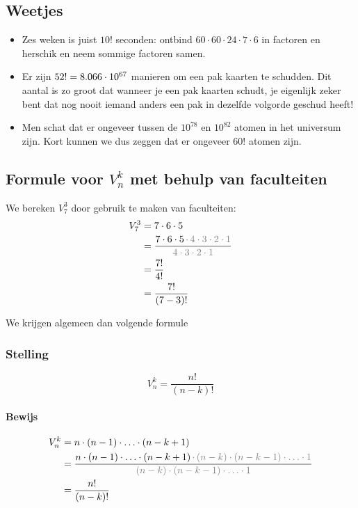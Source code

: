 \documentclass[12pt,a4paper,twoside]{article}
\begin{document}
\subsection*{Weetjes}
\begin{itemize}
  \item Zes weken is juist $10!$ seconden: ontbind $60\cdot 60\cdot 24\cdot 7\cdot 6$ in factoren en herschik en neem sommige factoren samen.
  \item Er zijn $52!=8.066\cdot 10^{67}$ manieren om een pak kaarten te schudden. Dit aantal is zo groot dat wanneer je een pak kaarten schudt, je eigenlijk zeker bent dat nog nooit iemand anders een pak in dezelfde volgorde geschud heeft!
  \item Men schat dat er ongeveer tussen de $10^{78}$ en $10^{82}$ atomen in het universum zijn. Kort kunnen we dus zeggen dat er ongeveer $60!$ atomen zijn.
\end{itemize}

\subsection{Formule voor $V^k_n$ met behulp van faculteiten}

We bereken $V^3_7$ door gebruik te maken van faculteiten:
\begin{align*}
  V^3_7 &= 7 \cdot 6 \cdot 5\\
        &= \dfrac{7 \cdot 6 \cdot 5 \, \color{gray}{ \cdot \, 4 \cdot 3 \cdot 2 \cdot 1}}{\color{gray}{4 \cdot 3 \cdot 2 \cdot 1}}\\
        &= \dfrac{7!}{4!}\\
        &= \dfrac{7!}{(7-3)!}\\
\end{align*}

We krijgen algemeen dan volgende formule

\subsubsection*{Stelling}
\begin{mdframed}
$$V^k_n=\dfrac{n!}{(n-k)!}$$
\end{mdframed}

\paragraph*{Bewijs}
\begin{align*}
  V^k_n &= n \cdot (n-1) \cdot \ldots \cdot (n-k+1)\\
        &= \dfrac{n \cdot (n-1) \cdot \ldots \cdot (n-k+1) \, \color{gray}{ \cdot \, (n-k) \cdot (n-k-1) \cdot \ldots \cdot 1}}{\color{gray}{(n-k) \cdot (n-k-1) \cdot \ldots \cdot 1}}\\
        &= \dfrac{n!}{(n-k)!}\\
\end{align*}
\end{document}
